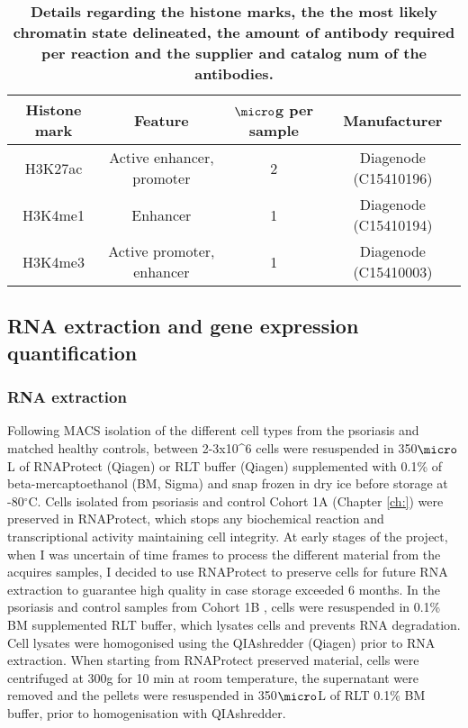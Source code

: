 \begin{table}[htbp]
\setlength{\tabcolsep}{20pt}
\renewcommand{\arraystretch}{1.5}
\begin{tabular}{@{} c c c c}
\toprule
\textbf{Histone mark} & \textbf{Feature} &\textbf{$\micro$g per sample} & \textbf{Manufacturer}\\
\midrule
H3K27ac & Active enhancer, promoter & 2 & Diagenode (C15410196)\\
H3K4me1 & Enhancer & 1 & Diagenode (C15410194)\\
H3K4me3 & Active promoter, enhancer & 1 & Diagenode (C15410003) \\
\bottomrule
\end{tabular}
\medskip %
\caption[Antibody panel used for immunoprecipitation of histone marks in ChIPm]{\textbf{Details regarding the histone marks, the the most likely chromatin state delineated, the amount of antibody required per reaction and the supplier and catalog num of the antibodies.}}
\label{tab:ChIPm_antibodies}
\end{table}
\bigskip %


\subsection{RNA extraction and gene expression quantification}

\subsubsection{RNA extraction}
Following MACS isolation of the different cell types from the psoriasis and matched healthy controls, between 2-3x10^6 cells were resuspended in 350$\micro$L of RNAProtect (Qiagen) or RLT buffer (Qiagen) supplemented with 0.1\% of beta-mercaptoethanol (BM, Sigma) and snap frozen in dry ice before storage at -80{$^\circ$}C. Cells isolated from psoriasis and control Cohort 1A (Chapter \ref{ch:}) were preserved in RNAProtect, which stops any biochemical reaction and transcriptional activity maintaining cell integrity. At early stages of the project, when I was uncertain of time frames to process the different material from the acquires samples, I decided to use RNAProtect to preserve cells for future RNA extraction to guarantee high quality in case storage exceeded 6 months. In the psoriasis and control samples from Cohort 1B %
, cells were resuspended in 0.1\% BM supplemented RLT buffer, which lysates cells and prevents RNA degradation. Cell lysates were homogonised using the QIAshredder (Qiagen) prior to RNA extraction. When starting from RNAProtect preserved material, cells were centrifuged at 300g for 10 min at room temperature, the supernatant were removed and the pellets were resuspended in 350$\micro$L of RLT 0.1\% BM buffer, prior to homogenisation with QIAshredder.


